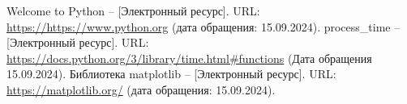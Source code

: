 \documentclass[a4paper, 14pt]{extreport}
\makeatletter
\renewcommand\Large{\@setfontsize\Large{20pt}{20}}
\makeatother
\begin{document}
    \clearpage

    \renewcommand{\bibname}{\begin{center}
                                \Large СПИСОК ИСПОЛЬЗОВАННЫХ ИСТОЧНИКОВ
    \end{center}}
    \begin{thebibliography}{}
        Welcome to Python -- [Электронный ресурс]. URL: \url{https://https://www.python.org} (дата обращения: 15.09.2024).
        process\_time -- [Электронный ресурс]. URL: \url{https://docs.python.org/3/library/time.html\#functions} (Дата обращения 15.09.2024).
        Библиотека matplotlib -- [Электронный ресурс]. URL: \url{https://matplotlib.org/} (дата обращения: 15.09.2024).
    \end{thebibliography}
\end{document}

